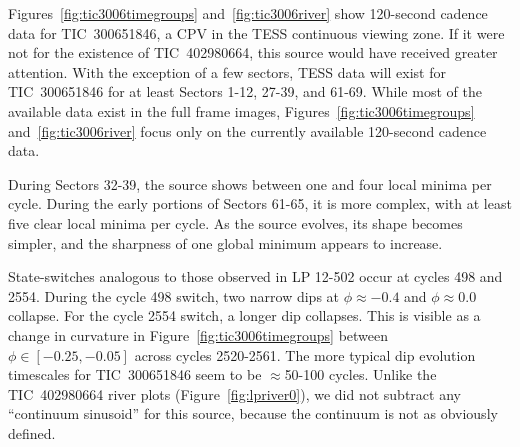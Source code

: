 \documentclass[11pt,twocolumn,tighten]{aastex63}
\begin{document}
Figures~\ref{fig:tic3006timegroups} and~\ref{fig:tic3006river} show
120-second cadence data for TIC~300651846, a CPV in the TESS
continuous viewing zone.  If it were not for the existence of
TIC~402980664, this source would have received greater
attention.  With the exception of a few sectors, TESS data will exist
for TIC~300651846 for at least Sectors 1-12, 27-39, and 61-69.  While
most of the available data exist in the full frame images,
Figures~\ref{fig:tic3006timegroups} and~\ref{fig:tic3006river} focus
only on the currently available 120-second cadence data.

During Sectors 32-39, the source shows between one and four local
minima per cycle.  During the early portions of Sectors 61-65, it is
more complex, with at least five clear local minima per
cycle.  As the source evolves, its shape becomes simpler, and the
sharpness of one global minimum appears to increase.

State-switches analogous to those observed in LP 12-502 occur at
cycles 498 and 2554.  During the cycle 498 switch, two narrow dips at
$\phi$$\approx$$-0.4$ and $\phi$$\approx$0.0 collapse.  For the cycle
2554 switch, a longer dip collapses.  This is visible as a change in
curvature in Figure~\ref{fig:tic3006timegroups} between $\phi \in
[-0.25, -0.05]$ across cycles 2520-2561.  The  more typical dip
evolution timescales for TIC~300651846 seem to be $\approx$50-100
cycles.  Unlike the TIC~402980664 river plots
(Figure~\ref{fig:lpriver0}), we did not subtract any ``continuum
sinusoid'' for this source, because the continuum is not as obviously
defined.


\begin{figure*}[!t]
	\begin{center}
	\end{center}
	\vspace{-0.4cm}
	\caption{
		{\bf Light curve evolution of TIC 300651846}.
    All available 120-second cadence data as of 2023 Aug 11 are shown.
    Cycles 0 to 622 span TESS Sectors 32-39 (Nov 2020--June 2021);
    cycles 2296-2676 span Sectors 61-65 (Jan--June 2023).  We assumed
    a 8.254\,hr period and a fixed reference epoch (BTJD 2174.127) for
    both panels.  Light curve segments are split based on the presence
    of gaps longer than three hours.  Cycle numbers are listed in the
    lower-right of each light curve segment.
	}
	\label{fig:tic3006timegroups}
\end{figure*}
\end{document}
